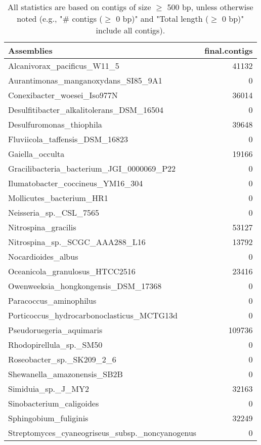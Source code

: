 \documentclass[12pt,a4paper]{article}
\begin{document}
\begin{table}[ht]
\begin{center}
\caption{All statistics are based on contigs of size $\geq$ 500 bp, unless otherwise noted (e.g., "\# contigs ($\geq$ 0 bp)" and "Total length ($\geq$ 0 bp)" include all contigs).}
\begin{tabular}{|l*{1}{|r}|}
\hline
Assemblies & final.contigs \\ \hline
Alcanivorax\_pacificus\_W11\_5 & 41132 \\ \hline
Aurantimonas\_manganoxydans\_SI85\_9A1 & 0 \\ \hline
Conexibacter\_woesei\_Iso977N & 36014 \\ \hline
Desulfitibacter\_alkalitolerans\_DSM\_16504 & 0 \\ \hline
Desulfuromonas\_thiophila & 39648 \\ \hline
Fluviicola\_taffensis\_DSM\_16823 & 0 \\ \hline
Gaiella\_occulta & 19166 \\ \hline
Gracilibacteria\_bacterium\_JGI\_0000069\_P22 & 0 \\ \hline
Ilumatobacter\_coccineus\_YM16\_304 & 0 \\ \hline
Mollicutes\_bacterium\_HR1 & 0 \\ \hline
Neisseria\_sp.\_CSL\_7565 & 0 \\ \hline
Nitrospina\_gracilis & 53127 \\ \hline
Nitrospina\_sp.\_SCGC\_AAA288\_L16 & 13792 \\ \hline
Nocardioides\_albus & 0 \\ \hline
Oceanicola\_granulosus\_HTCC2516 & 23416 \\ \hline
Owenweeksia\_hongkongensis\_DSM\_17368 & 0 \\ \hline
Paracoccus\_aminophilus & 0 \\ \hline
Porticoccus\_hydrocarbonoclasticus\_MCTG13d & 0 \\ \hline
Pseudoruegeria\_aquimaris & 109736 \\ \hline
Rhodopirellula\_sp.\_SM50 & 0 \\ \hline
Roseobacter\_sp.\_SK209\_2\_6 & 0 \\ \hline
Shewanella\_amazonensis\_SB2B & 0 \\ \hline
Simiduia\_sp.\_J\_MY2 & 32163 \\ \hline
Sinobacterium\_caligoides & 0 \\ \hline
Sphingobium\_fuliginis & 32249 \\ \hline
Streptomyces\_cyaneogriseus\_subsp.\_noncyanogenus & 0 \\ \hline

\end{tabular}
\end{center}
\end{table}
\end{document}
